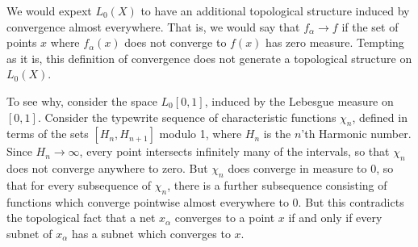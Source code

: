 \begin{example}
    We would expext $L_0(X)$ to have an additional topological structure induced by convergence almost everywhere. That is, we would say that $f_\alpha \to f$ if the set of points $x$ where $f_\alpha(x)$ does not converge to $f(x)$ has zero measure. Tempting as it is, this definition of convergence does not generate a topological structure on $L_0(X)$.

    To see why, consider the space $L_0[0,1]$, induced by the Lebesgue measure on $[0,1]$. Consider the typewrite sequence of characteristic functions $\chi_n$, defined in terms of the sets $[H_n, H_{n+1}]$ modulo 1, where $H_n$ is the $n$'th Harmonic number. Since $H_n \to \infty$, every point intersects infinitely many of the intervals, so that $\chi_n$ does not converge anywhere to zero. But $\chi_n$ does converge in measure to 0, so that for every subsequence of $\chi_n$, there is a further subsequence consisting of functions which converge pointwise almost everywhere to 0. But this contradicts the topological fact that a net $x_\alpha$ converges to a point $x$ if and only if every subnet of $x_\alpha$ has a subnet which converges to $x$.
\end{example}

